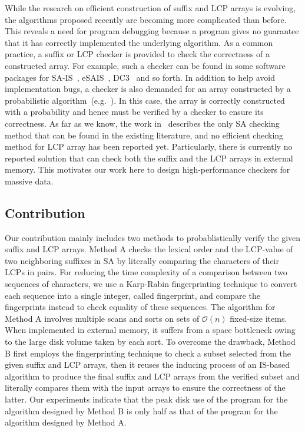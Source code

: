 \documentclass[10pt,journal,compsoc]{IEEEtran}
\begin{document}
While the research on efficient construction of suffix and LCP arrays is evolving, the algorithms proposed recently are becoming more complicated than before. This reveals a need for program debugging because a program gives no guarantee that it has correctly implemented the underlying algorithm. As a common practice, a suffix or LCP checker is provided to check the correctness of a constructed array. For example, such a checker can be found in some software packages for SA-IS~\cite{Nong11}, eSAIS~\cite{Bingmann12}, DC3~\cite{Dementiev08} and so forth. In addition to help avoid implementation bugs, a checker is also demanded for an array constructed by a probabilistic algorithm~(e.g.~\cite{Bille2013}). In this case, the array is correctly constructed with a probability and hence must be verified by a checker to ensure its correctness. As far as we know, the work in~\cite{Burkhardt2003} describes the only SA checking method that can be found in the existing literature, and no efficient checking method for LCP array has been reported yet. Particularly, there is currently no reported solution that can check both the suffix and the LCP arrays in external memory. This motivates our work here to design high-performance checkers for massive data.  
	
\subsection{Contribution}\label{sec:introduction:contribution}

Our contribution mainly includes two methods to probablistically verify the given suffix and LCP arrays. Method A checks the lexical order and the LCP-value of two neighboring suffixes in SA by literally comparing the characters of their LCPs in pairs. For reducing the time complexity of a comparison between two sequences of characters, we use a Karp-Rabin fingerprinting technique to convert each sequence into a single integer, called fingerprint, and compare the fingerprints instead to check equality of these sequences. The algorithm for Method A involves multiple scans and sorts on sets of $\mathcal{O}(n)$ fixed-size items. When implemented in external memory, it suffers from a space bottleneck owing to the large disk volume taken by each sort. 
To overcome the drawback, Method B first employs the fingerprinting technique to check a subset selected from the given suffix and LCP arrays, then it reuses the inducing process of an IS-based algorithm to produce the final suffix and LCP arrays from the verified subset and literally compares them with the input arrays to ensure the correctness of the latter. Our experiments indicate that the peak disk use of the program for the algorithm designed by Method B is only half as that of the program for the algorithm designed by Method A.
\end{document}
